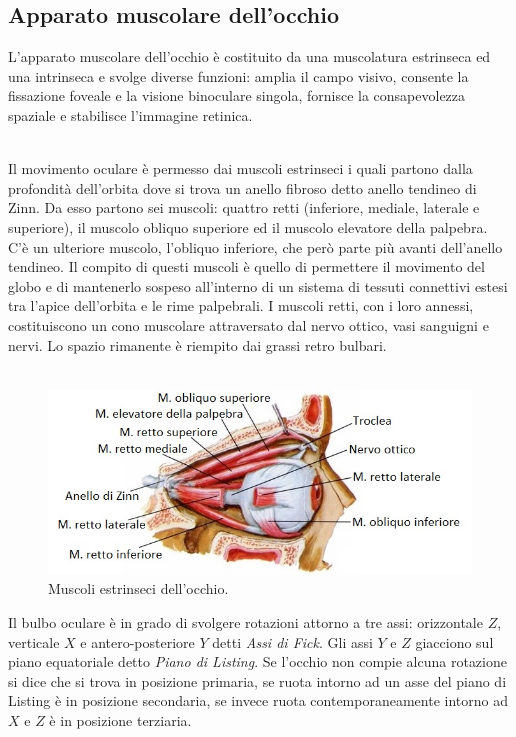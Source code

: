 \subsection{Apparato muscolare dell'occhio}

L’apparato muscolare dell'occhio è costituito da una muscolatura estrinseca ed una intrinseca e svolge diverse funzioni: amplia il campo visivo, consente la fissazione foveale e la visione binoculare singola, fornisce la consapevolezza spaziale e stabilisce l'immagine retinica.
\\\
 
Il movimento oculare è permesso dai muscoli estrinseci i quali partono dalla profondità dell’orbita dove si trova un anello fibroso detto anello tendineo di Zinn. Da esso partono sei muscoli: quattro retti (inferiore, mediale, laterale e superiore), il muscolo obliquo superiore ed il muscolo elevatore della palpebra. C’è un ulteriore muscolo, l’obliquo inferiore, che però parte più avanti dell’anello tendineo. Il compito di questi muscoli è quello di permettere il movimento del globo e di mantenerlo sospeso all’interno di un sistema di tessuti connettivi estesi tra l’apice dell’orbita e le rime palpebrali. I muscoli retti, con i loro annessi, costituiscono un cono muscolare attraversato dal nervo ottico, vasi sanguigni e nervi. Lo spazio rimanente è riempito dai grassi retro bulbari. 
\\\
\begin{figure}[h!]
	\centering
	\includegraphics[scale=2.7]{source/immagini/muscoli_estrinseci_occhio.jpg}
	\caption[Muscoli estrinseci dell'occhio]{Muscoli estrinseci dell'occhio.}
	\label{fig:test6}
\end{figure}

Il bulbo oculare è in grado di svolgere rotazioni attorno a tre assi: orizzontale $Z$, verticale $X$ e antero-posteriore $Y$ detti \emph{Assi di Fick}. Gli assi $Y$ e $Z$ giacciono sul piano equatoriale detto \emph{Piano di Listing}. Se l’occhio non compie alcuna rotazione si dice che si trova in posizione primaria, se ruota intorno ad un asse del piano di Listing  è in posizione secondaria, se invece ruota contemporaneamente intorno ad $X$ e $Z$ è in posizione terziaria.


